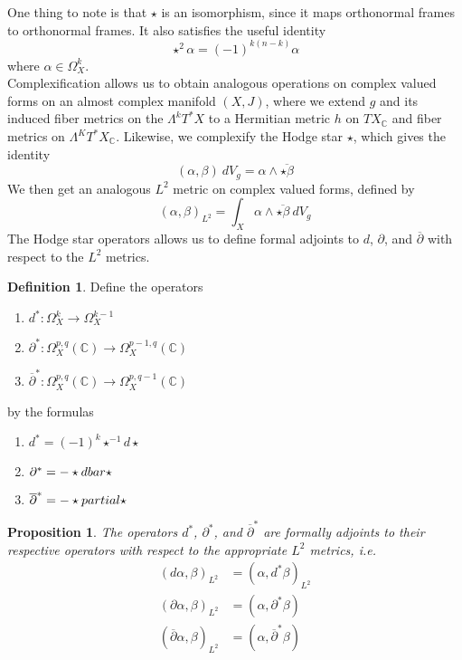 \documentclass[psamsfonts, 12pt]{amsart}
\newtheorem{prop}[thm]{Proposition}
\theoremstyle{definition}
\newtheorem{defn}[thm]{Definition}
\theoremstyle{remark}
\newcommand{\C}{\mathbb{C}}
\newcommand{\dbar}{\overline{\partial}}
\newcommand{\inv}{^{-1}}
\begin{document}
%
One thing to note is that $\star$ is an isomorphism, since it maps orthonormal frames
to orthonormal frames. It also satisfies the useful identity
\[
\star^2\alpha = (-1)^{k(n-k)}\alpha
\]
where $\alpha \in \Omega^k_X$. \\

Complexification allows us to obtain analogous operations on complex valued
forms on an almost complex manifold $(X,J)$, where we extend $g$ and its induced fiber
metrics on the $\Lambda^kT^*X$ to a Hermitian metric $h$ on $TX_\C$ and fiber metrics
on $\Lambda^KT^*X_\C$. Likewise, we complexify the Hodge star $\star$, which gives the
identity
\[
(\alpha,\beta)~dV_g = \alpha \wedge \overline{\star\beta}
\]
We then get an analogous $L^2$ metric on complex valued forms, defined by
\[
(\alpha,\beta)_{L^2} = \int_X \alpha \wedge \overline{\star\beta} ~dV_g
\]
The Hodge star operators allows us to define formal adjoints to $d$, $\partial$, and
$\dbar$ with respect to the $L^2$ metrics.
%
\begin{defn}
Define the operators
\begin{enumerate}
  \item $d^*: \Omega_X^k \to \Omega_X^{k-1}$
  \item $\partial^* : \Omega_X^{p,q}(\C) \to \Omega_X^{p-1,q}(\C)$
  \item $\dbar^* : \Omega_X^{p,q}(\C) \to \Omega_X^{p,q-1}(\C)$
\end{enumerate}
by the formulas
\begin{enumerate}
  \item $d^* = (-1)^k\star\inv d\star$
  \item $\partial^* = -\star\\dbar\star$
  \item $\dbar^* = -\star\\partial\star$
\end{enumerate}
\end{defn}
%
\begin{prop}
The operators $d^*$, $\partial^*$, and $\dbar^*$ are formally adjoints to their
respective operators with respect to the appropriate $L^2$ metrics, i.e.
\begin{align*}
(d\alpha,\beta)_{L^2} &= (\alpha, d^*\beta)_{L^2} \\
(\partial\alpha,\beta)_{L^2} &= (\alpha,\partial^*\beta) \\
(\dbar\alpha,\beta)_{L^2} &= (\alpha, \dbar^*\beta)
\end{align*}
\end{prop}
%
\end{document}
